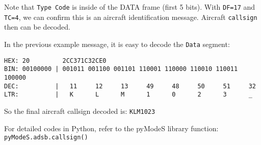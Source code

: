 Note that \texttt{Type\ Code} is inside of the DATA frame (first 5 bits). With \texttt{DF=17} and \texttt{TC=4}, we can confirm this is an aircraft identification message. Aircraft \texttt{callsign} then can be decoded.

In the previous example message, it is easy to decode the \texttt{Data} segment:

\begin{verbatim}
HEX: 20         2CC371C32CE0
BIN: 00100000 | 001011 001100 001101 110001 110000 110010 110011 100000
DEC:          |   11     12     13     49     48     50     51     32
LTR:          |   K      L      M      1      0      2      3      _
\end{verbatim}

So the final aircraft callsign decoded is: \texttt{KLM1023}

For detailed codes in Python, refer to the pyModeS library function: \texttt{pyModeS.adsb.callsign()}
